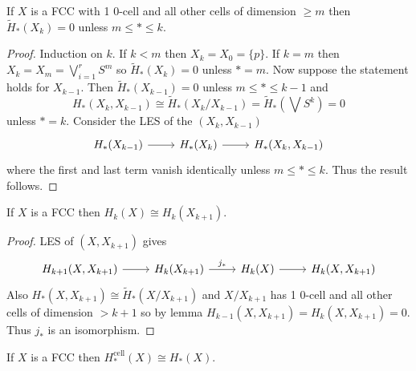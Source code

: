 \documentclass[a4paper]{article}
\newcommand{\cell}{\mathrm{cell}}
\begin{document}
\begin{lemma}
  If \(X\) is a FCC with 1 \(0\)-cell and all other cells of dimension \(\geq m\) then \(\widetilde H_*(X_k) = 0\) unless \(m \leq * \leq k\).
\end{lemma}

\begin{proof}
  Induction on \(k\). If \(k < m\) then \(X_k = X_0 = \{p\}\). If \(k = m\) then \(X_k = X_m = \bigvee_{i = 1}^r S^m\) so \(\widetilde H_*(X_k) = 0\) unless \(* = m\). Now suppose the statement holds for \(X_{k - 1}\). Then \(\widetilde H_*(X_{k - 1}) = 0\) unless \(m \leq * \leq k - 1\) and
  \[
    H_*(X_k, X_{k - 1}) \cong \widetilde H_*(X_k/X_{k - 1}) = \widetilde H_*(\bigvee S^k) = 0
  \]
  unless \(* = k\). Consider the LES of the \((X_k, X_{k - 1})\)
  \[
    \begin{tikzcd}
      H_*(X_{k - 1}) \ar[r] & H_*(X_k) \ar[r] & H_*(X_k, X_{k - 1})
    \end{tikzcd}
  \]
  where the first and last term vanish identically unless \(m \leq * \leq k\). Thus the result follows.
\end{proof}

\begin{corollary}
  If \(X\) is a FCC then \(H_k(X) \cong H_k(X_{k + 1})\).
\end{corollary}

\begin{proof}
  LES of \((X, X_{k + 1})\) gives
  \[
    \begin{tikzcd}
      H_{k + 1}(X, X_{k + 1}) \ar[r] & H_k(X_{k + 1}) \ar[r, "j_*"] & H_k(X) \ar[r] & H_k(X, X_{k + 1})
    \end{tikzcd}
  \]
  Also \(H_*(X, X_{k + 1}) \cong \widetilde H_*(X/X_{k + 1})\) and \(X/X_{k + 1}\) has 1 \(0\)-cell and all other cells of dimension \(> k + 1\) so by lemma \(H_{k - 1}(X, X_{k + 1}) = H_k(X, X_{k + 1}) = 0\). Thus \(j_*\) is an isomorphism.
\end{proof}

\begin{theorem}
  If \(X\) is a FCC then \(H_*^\cell(X) \cong H_*(X)\).
\end{theorem}
\end{document}
